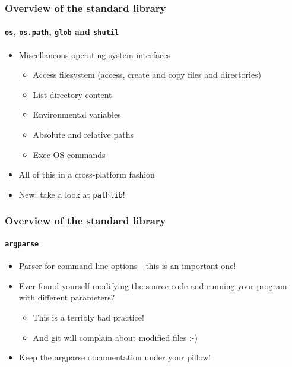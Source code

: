 \documentclass[9pt]{beamer}
\begin{document}
\begin{frame}
  \frametitle{Overview of the standard library}
  \framesubtitle{\texttt{os}, \texttt{os.path}, \texttt{glob} and
    \texttt{shutil}}
  \begin{itemize}
  \item Miscellaneous operating system interfaces
    \begin{itemize}
    \item Access filesystem (access, create and copy files and directories)
    \item List directory content
    \item Environmental variables
    \item Absolute and relative paths
    \item Exec OS commands
    \end{itemize}
  \item \alert{All of this in a cross-platform fashion}
  \item \alert{New: take a look at \texttt{pathlib}!}
  \end{itemize}
\end{frame}


\begin{frame}
  \frametitle{Overview of the standard library}
  \framesubtitle{\texttt{argparse}}
  \begin{itemize}
  \item \alert{Parser for command-line options---this is an important one!}
  \item Ever found yourself modifying the source code and running your
    program with different parameters?
    \begin{itemize}
    \item This is a terribly bad practice!
    \item And git will complain about modified files :-)
    \end{itemize}
  \item Keep the argparse documentation under your pillow!
  \end{itemize}
\end{frame}
\end{document}
